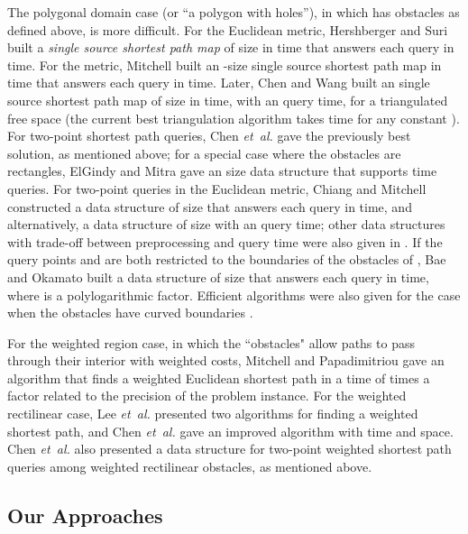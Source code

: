 \documentclass[english,runningheads,11pt]{llncs}
\def\etal{\textsl{et~al. }}
\begin{document}
The polygonal domain case (or ``a polygon with holes''), in which  has  obstacles as
defined above, is more difficult. For the Euclidean
metric, Hershberger and Suri \cite{ref:HershbergerAn99} built a {\em single source
shortest path map} of size  in  time that answers each
query in  time.
For the  metric, Mitchell
\cite{ref:MitchellAn89,ref:MitchellL192} built an -size single source shortest
path map in  time that answers each
query in  time. Later, Chen and Wang
\cite{ref:ChenA11ESA,ref:ChenCo12arXiv,ref:ChenL113STACS}
built an  single source shortest path map of size  in  time, with an
 query time, for a triangulated free
space (the current best triangulation algorithm takes
 time for any constant 
\cite{ref:Bar-YehudaTr94}).
For two-point  shortest path queries, Chen \etal \cite{ref:ChenSh00}
gave the previously best solution, as
mentioned above; for a special case where the obstacles are rectangles, ElGindy and Mitra \cite{ref:ElGindyOr94} gave an  size data structure that supports  time queries.
For two-point queries in the Euclidean metric,
Chiang and Mitchell \cite{ref:ChiangTw99}
constructed a data structure of size  that answers each
query in  time, and alternatively, a data
structure of size  with an  query time; other data structures
with trade-off between preprocessing and query time were also given in
\cite{ref:ChiangTw99}. If the query points  and  are both restricted
to the boundaries of the obstacles of , Bae and Okamato
\cite{ref:BaeQu12} built a data structure of size 
that answers each query in  time, where
 is a polylogarithmic factor.
Efficient algorithms were also given for the case when
the obstacles have curved boundaries
\cite{ref:ChenCo13,ref:ChenCo13SoCG,ref:ChewPl85,ref:HershbergerAn88,ref:HershbergerA13}.

For the weighted region case, in which
the ``obstacles" allow paths to pass through their
interior with weighted costs, Mitchell and Papadimitriou \cite{ref:MitchellTh91} gave an
algorithm that finds a weighted Euclidean shortest path in a time of 
times a factor related to the precision of the problem instance.
For the weighted rectilinear case, Lee \etal \cite{ref:LeeSh91}
presented two algorithms for finding a weighted 
shortest path, and Chen \etal \cite{ref:ChenSh00} gave an improved algorithm with
 time and  space. Chen
\etal \cite{ref:ChenSh00} also presented a data structure for
two-point weighted  shortest path queries among
weighted rectilinear obstacles, as mentioned above.

\subsection{Our Approaches}
\end{document}

